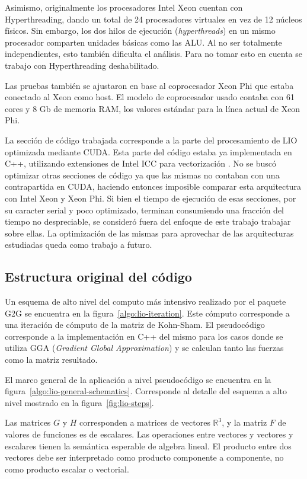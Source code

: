 Asimismo, originalmente los procesadores Intel Xeon cuentan con Hyperthreading,
dando un total de 24 procesadores virtuales en vez de 12 n\'ucleos f\'isicos.
Sin embargo, los dos hilos de ejecuci\'on (\textit{hyperthreads}) en un mismo
procesador comparten unidades b\'asicas como las ALU. Al no ser totalmente
independientes, esto tambi\'en dificulta el an\'alisis. Para no tomar esto en
cuenta se trabajo con Hyperthreading deshabilitado.

Las pruebas tambi\'en se ajustaron en base al coprocesador Xeon Phi que estaba
conectado al Xeon como host. El modelo de coprocesador usado contaba con 61 
cores y 8 Gb de memoria RAM, los valores est\'andar para la l\'inea actual de
Xeon Phi.

La secci\'on de c\'odigo trabajada corresponde a la parte del procesamiento
de LIO optimizada mediante CUDA. Esta parte del c\'odigo estaba ya implementada
en C++, utilizando extensiones de Intel ICC para vectorizaci\'on . No se busc\'o
optimizar otras secciones de c\'odigo ya que las mismas no contaban con una
contrapartida en CUDA, haciendo entonces imposible comparar esta arquitectura con
Intel Xeon y Xeon Phi. Si bien el tiempo de ejecuci\'on de esas secciones, por su
caracter serial y poco optimizado, terminan consumiendo una fracci\'on del tiempo
no despreciable, se consider\'o fuera del enfoque de este trabajo trabajar sobre
ellas. La optimizaci\'on de las mismas para aprovechar de las arquitecturas
estudiadas queda como trabajo a futuro.

\subsection{Estructura original del c\'odigo}

Un esquema de alto nivel del computo m\'as intensivo realizado por el paquete
G2G se encuentra en la figura~\ref{algo:lio-iteration}. Este c\'omputo corresponde
a una iteraci\'on de c\'omputo de la matriz de Kohn-Sham. El pseudoc\'odigo
corresponde a la implementaci\'on en C++ del mismo para los casos donde se
utiliza GGA (\textit{Gradient Global Approximation}) y se calculan tanto las
fuerzas como la matriz resultado.

El marco general de la aplicaci\'on a nivel pseudoc\'odigo se encuentra en la
figura~\ref{algo:lio-general-schematics}. Corresponde al detalle del esquema
a alto nivel mostrado en la figura~\ref{fig:lio-steps}.

Las matrices $G$ y $H$ corresponden a matrices de vectores $\mathbb{R}^3$, y
la matriz $F$ de valores de funciones es de escalares. Las operaciones entre
vectores y vectores y escalares tienen la sem\'antica esperable de algebra
lineal. El producto entre dos vectores debe ser interpretado como producto
componente a componente, no como producto escalar o vectorial.

